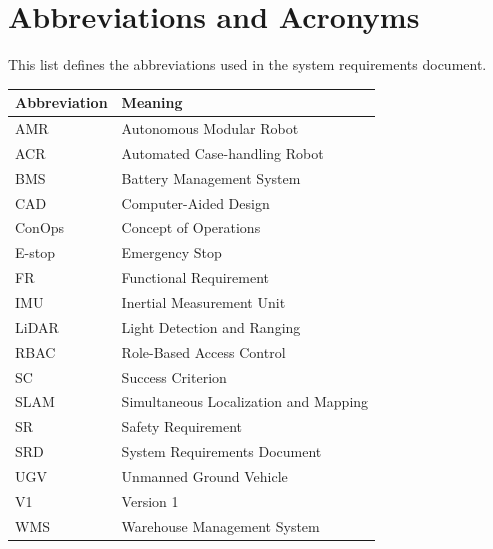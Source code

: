 \chapter*{Abbreviations and Acronyms}

This list defines the abbreviations used in the system requirements document.

\begin{longtable}{p{}p{}}
\toprule
\textbf{Abbreviation} & \textbf{Meaning} \\
\midrule
\endhead
AMR & Autonomous Modular Robot \\
ACR & Automated Case-handling Robot \\
BMS & Battery Management System \\
CAD & Computer-Aided Design \\
ConOps & Concept of Operations \\
E-stop & Emergency Stop \\
FR & Functional Requirement \\
IMU & Inertial Measurement Unit \\
LiDAR & Light Detection and Ranging \\
RBAC & Role-Based Access Control \\
SC & Success Criterion \\
SLAM & Simultaneous Localization and Mapping \\
SR & Safety Requirement \\
SRD & System Requirements Document \\
UGV & Unmanned Ground Vehicle \\
V1 & Version 1 \\
WMS & Warehouse Management System \\
\bottomrule
\end{longtable}
